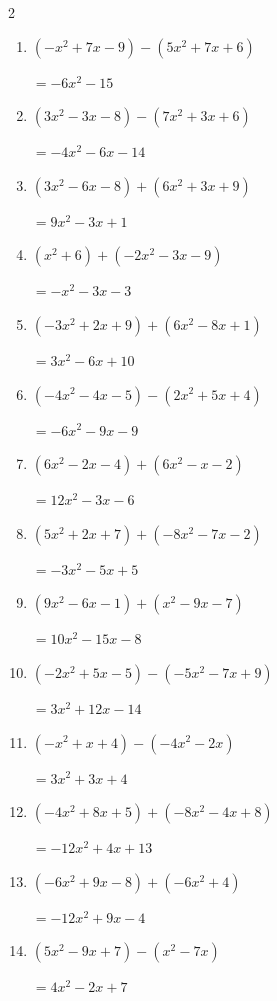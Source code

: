 \begin{multicols}{2}
\begin{enumerate}
  \item $(-x^{2}+7x-9)-(5x^{2}+7x+6)$

        $=-6x^{2}-15$

  \item $(3x^{2}-3x-8)-(7x^{2}+3x+6)$

        $=-4x^{2}-6x-14$

  \item $(3x^{2}-6x-8)+(6x^{2}+3x+9)$

        $=9x^{2}-3x+1$

\columnbreak %

  \item $(x^{2}+6)+(-2x^{2}-3x-9)$

        $=-x^{2}-3x-3$

  \item $(-3x^{2}+2x+9)+(6x^{2}-8x+1)$

        $=3x^{2}-6x+10$

  \item $(-4x^{2}-4x-5)-(2x^{2}+5x+4)$

        $=-6x^{2}-9x-9$

  \item $(6x^{2}-2x-4)+(6x^{2}-x-2)$

        $=12x^{2}-3x-6$

  \item $(5x^{2}+2x+7)+(-8x^{2}-7x-2)$

        $=-3x^{2}-5x+5$

  \item $(9x^{2}-6x-1)+(x^{2}-9x-7)$

        $=10x^{2}-15x-8$

  \item $(-2x^{2}+5x-5)-(-5x^{2}-7x+9)$

        $=3x^{2}+12x-14$

  \item $(-x^{2}+x+4)-(-4x^{2}-2x)$

        $=3x^{2}+3x+4$

  \item $(-4x^{2}+8x+5)+(-8x^{2}-4x+8)$

        $=-12x^{2}+4x+13$

  \item $(-6x^{2}+9x-8)+(-6x^{2}+4)$

        $=-12x^{2}+9x-4$

  \item $(5x^{2}-9x+7)-(x^{2}-7x)$

        $=4x^{2}-2x+7$


\end{enumerate}
\end{multicols}
